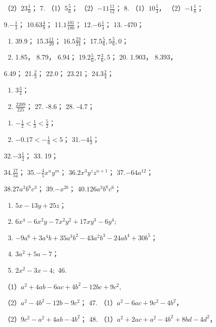 （2）\(23\frac{1}{0}\)； 7. （1）\(5\frac{5}{6}\)；
（2）\(-11\frac{11}{12}\)； 8. （1）\(10\frac{1}{3}\)，
（2）\(-1\frac{1}{8}\)；

9.\(-\frac{1}{3}\)； 10.\(63\frac{4}{9}\)； 11.\(1\frac{101}{180}\)；
12.\(-6\frac{1}{4}\)； 13. -470；

\begin{enumerate}[start=14]
\item
  39.9； 15.\(3\frac{11}{20}\)； 16.\(5\frac{23}{24}\)；
  17.\(5\frac{5}{6}, 5\frac{5}{6}, 0\)；
\item
  1.85， 8.79， 6.94； 19.\(2\frac{5}{6}, 7\frac{3}{6}, 5\)； 20.
  1.903， 8.393，
\end{enumerate}

6.49； 21.\(\frac{2}{3}\)； 22.0； 23.21； 24.\(3\frac{2}{4}\)；
\begin{enumerate}[start=25]
\item
  \(3\frac{3}{4}\)；
\item
  \(\frac{2209}{225}\)； 27. -8.6； 28. -4.7；
\end{enumerate}
\begin{enumerate}[start=29]
\item
  \(-\frac{1}{2} < \frac{1}{3} < \frac{5}{2}\)；
\item
  \(-0.17 < -\frac{1}{6} < 5\)； 31.\(-4\frac{1}{3}\)；
\end{enumerate}
32.\(-3\frac{1}{2}\)； 33. 19；

34.\(\frac{17}{54}\)； 35.\(-\frac{4}{5} x^n y^m\)；
36.\(2x^3y^z z^{n+1}\)； 37.\(-64a^{12}\)；

38.\(27a^{3}b^{6}c^{3}\)； 39.\(-x^{2b}\)； 40.\(126a^{3}b^{6}c^{6}\)；
\begin{enumerate}[start=41]
\item
  \(5x - 13y + 25z\)；
\item
  \(6x^{4} - 6x^{2}y - 7x^{2}y^{2} + 17xy^{3} - 6y^{4};\)
\item
  \(-9a^{6} + 3a^{4}b + 35a^{3}b^{2} - 43a^{2}b^{3} - 24ab^{4} + 30b^{5}\)；
\item
  \(3a^{2} + 5a - 7\)；
\item
  \(2x^{2} - 3x - 4;\) 46.
\end{enumerate}
（1）\(a^2 + 4ab - 6ac + 4b^2 - 12bc + 9c^2,\)

（2）\(a^2 - 4b^2 - 12b - 9c^2\)； 47.
（1）\(a^2 - 6ac + 9c^2 - 4b^2\)，

（2）\(9c^{2} - a^{2} + 4ab - 4b^{2}\)； 48.
（1）\(a^{2} + 2ac + a^{2} - 4b^{2} + 8bd - 4d^{2}\)，

